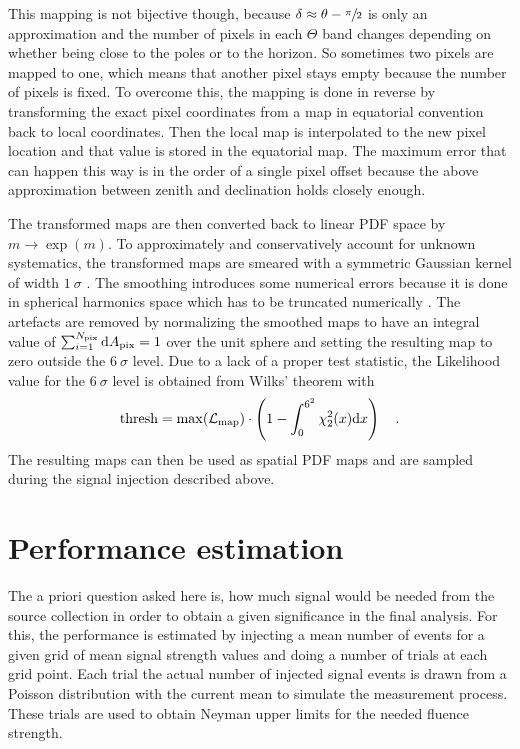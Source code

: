 This mapping is not bijective though, because $\delta \approx \theta - \sfrac{\pi}{2}$ is only an approximation and the number of pixels in each $\Theta$ band changes depending on whether being close to the poles or to the horizon.
So sometimes two pixels are mapped to one, which means that another pixel stays empty because the number of pixels is fixed.
To overcome this, the mapping is done in reverse by transforming the exact pixel coordinates from a map in equatorial convention back to local coordinates.
Then the local map is interpolated to the new pixel location and that value is stored in the equatorial map.
The maximum error that can happen this way is in the order of a single pixel offset because the above approximation between zenith and declination holds closely enough.

The transformed maps are then converted back to linear PDF space by $m\rightarrow \exp{(m)}$.
To approximately and conservatively account for unknown systematics, the transformed maps are smeared with a symmetric Gaussian kernel of width $\SI{1}{\sigma}$ .
The smoothing introduces some numerical errors because it is done in spherical harmonics space which has to be truncated numerically .
The artefacts are removed by normalizing the smoothed maps to have an integral value of $\sum_{i=1}^{N_\text{pix}} \mathrm{d}A_\text{pix} = 1$ over the unit sphere and setting the resulting map to zero outside the $\SI{6}{\sigma}$ level.
Due to a lack of a proper test statistic, the Likelihood value for the $\SI{6}{\sigma}$ level is obtained from Wilks' theorem with
\begin{equation}
  \text{thresh} =
    \max(\mathcal{L}_\text{map})\cdot
    \left(1 - \int_0^{6^2}\chi^2_{2}(x)\mathrm{d}x\right)
  \quad\text{.}
\end{equation}
The resulting maps can then be used as spatial PDF maps and are sampled during the signal injection described above.


\section{Performance estimation}
The a priori question asked here is, how much signal would be needed from the source collection in order to obtain a given significance in the final analysis.
For this, the performance is estimated by injecting a mean number of events for a given grid of mean signal strength values and doing a number of trials at each grid point.
Each trial the actual number of injected signal events is drawn from a Poisson distribution with the current mean to simulate the measurement process.
These trials are used to obtain Neyman upper limits  for the needed fluence strength.

